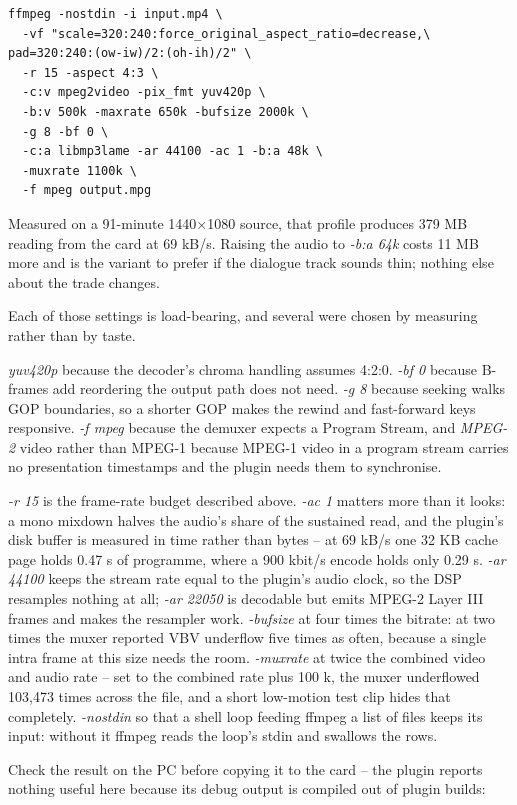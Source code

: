\begin{verbatim}
ffmpeg -nostdin -i input.mp4 \
  -vf "scale=320:240:force_original_aspect_ratio=decrease,\
pad=320:240:(ow-iw)/2:(oh-ih)/2" \
  -r 15 -aspect 4:3 \
  -c:v mpeg2video -pix_fmt yuv420p \
  -b:v 500k -maxrate 650k -bufsize 2000k \
  -g 8 -bf 0 \
  -c:a libmp3lame -ar 44100 -ac 1 -b:a 48k \
  -muxrate 1100k \
  -f mpeg output.mpg
\end{verbatim}

Measured on a 91-minute 1440$\times$1080 source, that profile produces 379 MB reading
from the card at 69 kB/s. Raising the audio to \emph{-b:a 64k} costs 11 MB more and is the
variant to prefer if the dialogue track sounds thin; nothing else about the trade changes.

Each of those settings is load-bearing, and several were chosen by measuring
rather than by taste.

\emph{yuv420p} because the decoder's chroma handling assumes 4:2:0. \emph{-bf 0} because
B-frames add reordering the output path does not need. \emph{-g 8} because seeking walks
GOP boundaries, so a shorter GOP makes the rewind and fast-forward keys responsive.
\emph{-f mpeg} because the demuxer expects a Program Stream, and \emph{MPEG-2} video rather
than MPEG-1 because MPEG-1 video in a program stream carries no presentation timestamps and
the plugin needs them to synchronise.

\emph{-r 15} is the frame-rate budget described above. \emph{-ac 1} matters more than it
looks: a mono mixdown halves the audio's share of the sustained read, and the plugin's disk
buffer is measured in time rather than bytes -- at 69 kB/s one 32 KB cache page holds
0.47 s of programme, where a 900 kbit/s encode holds only 0.29 s. \emph{-ar 44100} keeps
the stream rate equal to the plugin's audio clock, so the DSP resamples nothing at all;
\emph{-ar 22050} is decodable but emits MPEG-2 Layer III frames and makes the resampler
work. \emph{-bufsize} at four times the bitrate: at two times the muxer reported VBV
underflow five times as often, because a single intra frame at this size needs the room.
\emph{-muxrate} at twice the combined video and audio rate -- set to the combined rate plus
100 k, the muxer underflowed 103,473 times across the file, and a short low-motion test
clip hides that completely. \emph{-nostdin} so that a shell loop feeding ffmpeg a list of
files keeps its input: without it ffmpeg reads the loop's stdin and swallows the rows.

Check the result on the PC before copying it to the card -- the plugin reports nothing
useful here because its debug output is compiled out of plugin builds:


